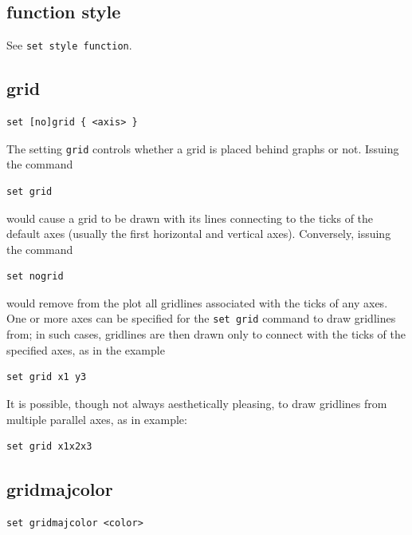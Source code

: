 \subsection{function style}

See {\tt set style function}.


\subsection{grid}

\begin{verbatim}
set [no]grid { <axis> }
\end{verbatim}

The setting {\tt grid} controls whether a grid is placed behind graphs or not.
Issuing the command

\begin{verbatim}
set grid
\end{verbatim}

\noindent would cause a grid to be drawn with its lines connecting to the ticks
of the default axes (usually the first horizontal and vertical axes).
Conversely, issuing the command

\begin{verbatim}
set nogrid
\end{verbatim}

\noindent would remove from the plot all gridlines associated with the ticks of
any axes.  One or more axes can be specified for the {\tt set grid} command to
draw gridlines from; in such cases, gridlines are then drawn only to connect
with the ticks of the specified axes, as in the example

\begin{verbatim}
set grid x1 y3
\end{verbatim}

It is possible, though not always aesthetically pleasing, to draw gridlines
from multiple parallel axes, as in example:

\begin{verbatim}
set grid x1x2x3
\end{verbatim}


\subsection{gridmajcolor}

\begin{verbatim}
set gridmajcolor <color>
\end{verbatim}

